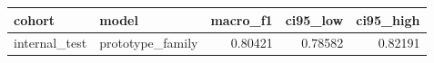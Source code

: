 \begin{tabular}{llrrr}
\toprule
cohort & model & macro\_f1 & ci95\_low & ci95\_high \\
\midrule
internal\_test & prototype\_family & 0.80421 & 0.78582 & 0.82191 \\
\bottomrule
\end{tabular}
